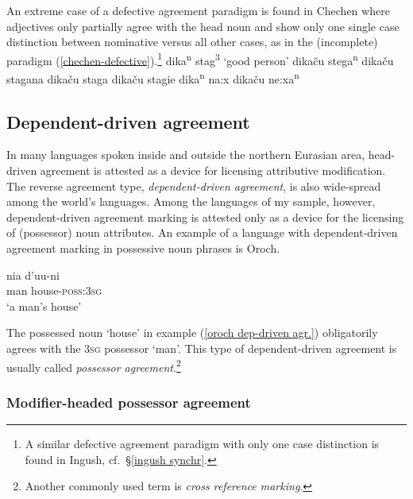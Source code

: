 An extreme case of a defective agreement paradigm is found in Chechen where adjectives only partially agree with the head noun and show only one single case distinction between nominative versus all other cases, as in the (incomplete) paradigm (\ref{chechen-defective}).\footnote{A similar defective agreement paradigm with only one case distinction is found in Ingush, cf.~\S\ref{ingush synchr}.}
\ea \label{chechen-defective}
\ea dika\textsuperscript{n} stag\textsuperscript{3} {\rm ‘good person’}	
\ex dikaču stega\textsuperscript{n} 							
\ex dikaču stagana 										
\ex dikaču staga 										
\ex dikaču stagie										
\ex dika\textsuperscript{n} na:x								
\ex dikaču ne:xa\textsuperscript{n}							
\zl

\subsection{Dependent-driven agreement}

In many languages spoken inside and outside the northern Eurasian area, head-driven agreement is attested as a device for licensing attributive modification. The reverse agreement type, \emph{dependent-driven agreement}, is also wide-spread among the world's languages. Among the languages of my sample, however, dependent-driven agreement marking is attested only as a device for the licensing of (possessor) noun attributes. An example of a language with dependent-driven agreement marking in possessive noun phrases is Oroch.
\begin{exe}
\ex
{} \label{oroch dep-driven agr.}
\gll 	nia	d'uu-ni\\
	man	house-\textsc{poss:3sg}\\
\glt	‘a man's house’
\end{exe}
The possessed noun ‘house’ in example (\ref{oroch dep-driven agr.}) obligatorily agrees with the \textsc{3sg} possessor ‘man’. This type of dependent-driven agreement is usually called \emph{possessor agreement}.\footnote{Another commonly used term is \emph{cross reference marking}.}

\subsubsection{Modifier-headed possessor agreement} \label{ModheadAgr}

